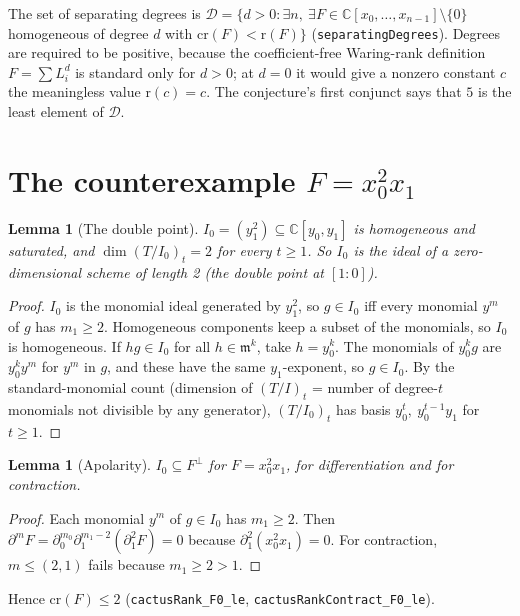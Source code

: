 \documentclass[11pt]{article}
\newtheorem{lemma}[theorem]{Lemma}
\theoremstyle{definition}
\begin{document}
The set of separating degrees is
$\mathcal D=\{d>0:\exists n,\ \exists F\in\mathbb C[x_0,\dots,x_{n-1}]\setminus\{0\}$ homogeneous of
degree $d$ with $\mathrm{cr}(F)<\mathrm r(F)\}$ (\texttt{separatingDegrees}). Degrees are required to
be positive, because the coefficient-free Waring-rank definition $F=\sum L_i^d$ is standard only
for $d>0$; at $d=0$ it would give a nonzero constant $c$ the meaningless value $\mathrm r(c)=c$.
The conjecture's first conjunct says that $5$ is the least element of $\mathcal D$.

\section{The counterexample $F=x_0^2x_1$}

\begin{lemma}[The double point]
$I_0=(y_1^2)\subseteq\mathbb C[y_0,y_1]$ is homogeneous and saturated, and $\dim(T/I_0)_t=2$ for
every $t\ge1$. So $I_0$ is the ideal of a zero-dimensional scheme of length 2 (the double point at
$[1:0]$).
\end{lemma}
\begin{proof}
$I_0$ is the monomial ideal generated by $y_1^2$, so $g\in I_0$ iff every monomial $y^m$ of $g$ has
$m_1\ge 2$. Homogeneous components keep a subset of the monomials, so $I_0$ is homogeneous. If
$hg\in I_0$ for all $h\in\mathfrak m^k$, take $h=y_0^k$. The monomials of $y_0^kg$ are
$y_0^ky^m$ for $y^m$ in $g$, and these have the same $y_1$-exponent, so $g\in I_0$. By the
standard-monomial count (dimension of $(T/I)_t$ = number of degree-$t$ monomials not divisible by
any generator), $(T/I_0)_t$ has basis $y_0^t,\ y_0^{t-1}y_1$ for $t\ge1$.
\end{proof}

\begin{lemma}[Apolarity]
$I_0\subseteq F^\perp$ for $F=x_0^2x_1$, for differentiation and for contraction.
\end{lemma}
\begin{proof}
Each monomial $y^m$ of $g\in I_0$ has $m_1\ge2$. Then $\partial^mF=\partial_0^{m_0}
\partial_1^{m_1-2}(\partial_1^2F)=0$ because $\partial_1^2(x_0^2x_1)=0$. For contraction, $m\le
(2,1)$ fails because $m_1\ge2>1$.
\end{proof}

Hence $\mathrm{cr}(F)\le 2$ (\texttt{cactusRank\_F0\_le}, \texttt{cactusRankContract\_F0\_le}).
\end{document}
